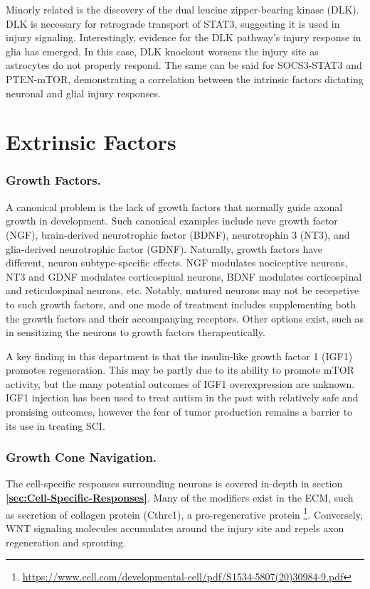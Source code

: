 Minorly related is the discovery of the dual leucine zipper-bearing kinase (DLK). DLK is necessary for retrograde transport of STAT3, suggesting it is used in injury signaling. Interestingly, evidence for the DLK pathway's injury response in glia has emerged. In this case, DLK knockout worsens the injury site as astrocytes do not properly respond. The same can be said for SOCS3-STAT3 and PTEN-mTOR, demonstrating a correlation between the intrinsic factors dictating neuronal and glial injury responses. 


\section{Extrinsic Factors}

\subsubsection{Growth Factors.}

A canonical problem is the lack of growth factors that normally guide axonal growth in development. Such canonical examples include neve growth factor (NGF), brain-derived neurotrophic factor (BDNF), neurotrophin 3 (NT3), and glia-derived neurotrophic factor (GDNF). Naturally, growth factors have different, neuron subtype-specific effects. NGF modulates nociceptive neurons, NT3 and GDNF modulates corticospinal neurons, BDNF modulates corticospinal and reticulospinal neurons, etc. Notably, matured neurons may not be recepetive to such growth factors, and one mode of treatment includes supplementing both the growth factors and their accompanying receptors. Other options exist, such as in sensitizing the neurons to growth factors therapeutically.\newline

A key finding in this department is that the insulin-like growth factor 1 (IGF1) promotes regeneration. This may be partly due to its ability to promote mTOR activity, but the many potential outcomes of IGF1 overexpression are unknown. IGF1 injection has been used to treat autism in the past with relatively safe and promising outcomes, however the fear of tumor production remains a barrier to its use in treating SCI.

\subsubsection{Growth Cone Navigation.}

The cell-specific responses surrounding neurons is covered in-depth in section \textbf{\ref{sec:Cell-Specific-Responses}}. Many of the modifiers exist in the ECM, such as secretion of collagen protein (Cthrc1), a pro-regenerative protein \footnote{\url{https://www.cell.com/developmental-cell/pdf/S1534-5807(20)30984-9.pdf}}. Conversely, WNT signaling molecules accumulates around the injury site and repels axon regeneration and sprouting.\newline 

